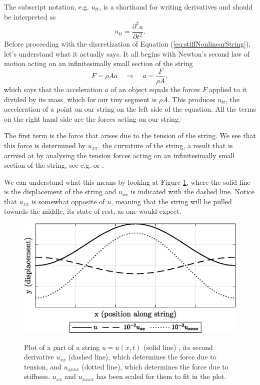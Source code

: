 \documentclass{article}
\begin{document}
\noindent The subscript notation, e.g. $u_{tt}$, is a shorthand for writing derivatives and should be interpreted as
\begin{equation}
  u_{tt} = \frac{\partial^2u}{\partial t^2}.
\end{equation}
%
Before proceeding with the discretization of Equation (\ref{eq:stiffNonlinearString}), let's understand what it actually says.
It all begins with Newton's second law of motion acting on an infinitesimally small section of the string
\begin{equation}
  F = \rho A a \quad \Rightarrow \quad a = \frac{F}{\rho A},
\end{equation}
which says that the acceleration $a$ of an object equals the forces $F$ applied to it divided by its mass, which for our tiny segment is $\rho A$.
This produces $u_{tt}$, the acceleration of a point on our string on the left side of the equation.
All the terms on the right hand side are the forces acting on our string.

The first term is the force that arises due to the tension of the string.
We see that this force is determined by $u_{xx}$, the curvature of the string, a result that is arrived at by analysing the tension forces acting on an infinitesimally small section of the string, see e.g. \cite[Chapter~2]{fletcher_physics_1998} or \cite[Chapter~6]{bilbao_numerical_2009}.

We can understand what this means by looking at Figure \ref{fig:diffplot}, where the solid line is the displacement of the string and $u_{xx}$ is indicated with the dashed line.
Notice that $u_{xx}$ is somewhat opposite of $u$, meaning that the string will be pulled towards the middle, its state of rest, as one would expect.

\begin{figure}[h]
  \includegraphics[width=\linewidth]{diffplot.eps}
  \label{fig:diffplot}
  \caption{Plot of a part of a string $u = u(x,t)$ (solid line) , its second derivative $u_{xx}$ (dashed line), which determines the force due to tension, and $u_{xxxx}$ (dotted line), which determines the force due to stiffness. $u_{xx}$ and $u_{xxxx}$ has been scaled for them to fit in the plot.}
\end{figure}
\end{document}
